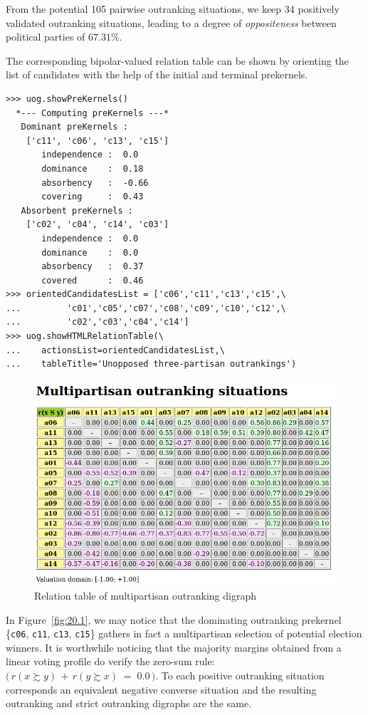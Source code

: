 From the potential 105 pairwise outranking situations, we keep 34 positively validated outranking situations, leading to a degree of \emph{oppositeness} between political parties of $67.31\%$.

The corresponding bipolar-valued relation table can be shown by orienting the list of candidates with the help of the initial and terminal prekernels.
\begin{lstlisting}[caption={Computing unopposed multiobjective outranking situations},label=list:20.4]
>>> uog.showPreKernels()
  *--- Computing preKernels ---*
   Dominant preKernels :
    ['c11', 'c06', 'c13', 'c15']
       independence :  0.0
       dominance    :  0.18
       absorbency   :  -0.66
       covering     :  0.43
   Absorbent preKernels :
    ['c02', 'c04', 'c14', 'c03']
       independence :  0.0
       dominance    :  0.0
       absorbency   :  0.37
       covered      :  0.46
>>> orientedCandidatesList = ['c06','c11','c13','c15',\
...         'c01','c05','c07','c08','c09','c10','c12',\
...         'c02','c03','c04','c14']
>>> uog.showHTMLRelationTable(\
...    actionsList=orientedCandidatesList,\
...    tableTitle='Unopposed three-partisan outrankings')
\end{lstlisting}

\begin{figure}[ht]
\includegraphics[width=0.9\hsize]{Figures/20-1-unOpposedOutrankings.png}
\caption{Relation table of multipartisan outranking digraph} 
\label{fig:20.1}       %
\end{figure}

In Figure~\vref{fig:20.1}, we may notice that the dominating outranking prekernel \{\texttt{c06}, \texttt{c11}, \texttt{c13}, \texttt{c15}\} gathers in fact a multipartisan selection of potential election winners. It is worthwhile noticing that the majority margins obtained from a linear voting profile do verify the zero-sum rule: $\big(\,r(x \succsim y) \,+\, r(y \succsim x) \;=\; 0.0\,\big)$. To each positive outranking situation corresponds an equivalent negative converse situation and the resulting outranking and strict outranking digraphs are the same.

